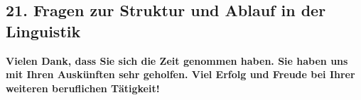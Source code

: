 \documentclass[a4paper,10pt]{article}
\begin{document}
{

\pagebreak


\subsection*{21. Fragen zur Struktur und Ablauf in der Linguistik}




\bigskip

\begin{flushleft}
\textbf{Vielen Dank, dass Sie sich die Zeit genommen haben. Sie haben uns mit Ihren Auskünften sehr geholfen. Viel Erfolg und Freude bei Ihrer weiteren beruflichen Tätigkeit!}
\end{flushleft}


}
\end{document}
